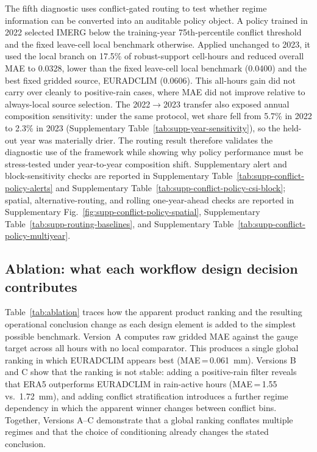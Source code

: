 \documentclass[preprint,12pt]{elsarticle}
\begin{document}
The fifth diagnostic uses conflict-gated routing to test whether regime information can be converted into an auditable policy object. A policy trained in 2022 selected IMERG below the training-year 75th-percentile conflict threshold and the fixed leave-cell local benchmark otherwise. Applied unchanged to 2023, it used the local branch on 17.5\% of robust-support cell-hours and reduced overall MAE to 0.0328, lower than the fixed leave-cell local benchmark (0.0400) and the best fixed gridded source, EURADCLIM (0.0606). This all-hours gain did not carry over cleanly to positive-rain cases, where MAE did not improve relative to always-local source selection. The 2022$\rightarrow$2023 transfer also exposed annual composition sensitivity: under the same protocol, wet share fell from 5.7\% in 2022 to 2.3\% in 2023 (Supplementary Table~\ref{tab:supp-year-sensitivity}), so the held-out year was materially drier. The routing result therefore validates the diagnostic use of the framework while showing why policy performance must be stress-tested under year-to-year composition shift. Supplementary alert and block-sensitivity checks are reported in Supplementary Table~\ref{tab:supp-conflict-policy-alerts} and Supplementary Table~\ref{tab:supp-conflict-policy-csi-block}; spatial, alternative-routing, and rolling one-year-ahead checks are reported in Supplementary Fig.~\ref{fig:supp-conflict-policy-spatial}, Supplementary Table~\ref{tab:supp-routing-baselines}, and Supplementary Table~\ref{tab:supp-conflict-policy-multiyear}.

\subsection{Ablation: what each workflow design decision contributes}

Table~\ref{tab:ablation} traces how the apparent product ranking and the resulting operational conclusion change as each design element is added to the simplest possible benchmark. Version~A computes raw gridded MAE against the gauge target across all hours with no local comparator. This produces a single global ranking in which EURADCLIM appears best (MAE\,=\,0.061~mm). Versions B and C show that the ranking is not stable: adding a positive-rain filter reveals that ERA5 outperforms EURADCLIM in rain-active hours (MAE\,=\,1.55 vs.\ 1.72~mm), and adding conflict stratification introduces a further regime dependency in which the apparent winner changes between conflict bins. Together, Versions A--C demonstrate that a global ranking conflates multiple regimes and that the choice of conditioning already changes the stated conclusion.
\end{document}

